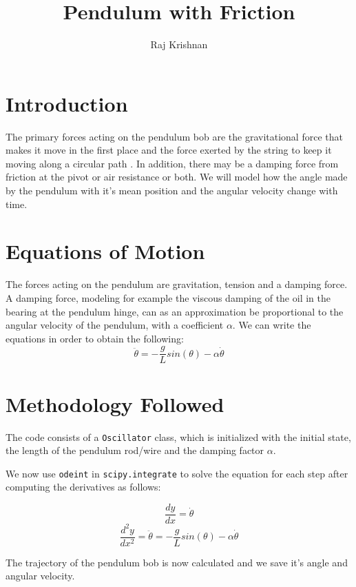 \documentclass[12pt,english]{article}
\title{Pendulum with Friction}
\author{Raj Krishnan}
\begin{document}
\maketitle

\section{Introduction}
  The primary forces acting on the pendulum bob are the gravitational force 
  that makes it move in the first place and the force exerted by the string
  to keep it moving along a circular path \cite{surrow}. In addition, there may be a 
  damping force from friction at the pivot or air resistance or both. We 
  will model how the angle made by the pendulum with it's mean position and
  the angular velocity change with time.

\section{Equations of Motion}
  
  The forces acting on the pendulum are gravitation, tension and a damping
  force. A damping force, modeling for example the viscous damping of the 
  oil in the bearing at the pendulum hinge, can as an approximation be 
  proportional to the angular velocity of the pendulum, with a coefficient 
  $\alpha$. We can write the equations \cite{james} in order to obtain the 
  following:
  \begin{equation}
          \label{eq:eom}
          \ddot{\theta} = -\frac{g}{L}sin(\theta) - \alpha \dot{\theta}                    
  \end{equation}

\section{Methodology Followed}

  The code consists of a \texttt{Oscillator} class, which is initialized with 
  the initial state, the length of the pendulum rod/wire and the damping factor
  $\alpha$. 

  We now use \texttt{odeint} in \texttt{scipy.integrate} to solve the equation 
  for each step after computing the derivatives as follows:
   
  $$\frac{dy}{dx} = \dot{\theta}$$
  $$\frac{d^2y}{dx^2} = \ddot{\theta} 
                      = -\frac{g}{L}sin(\theta) - \alpha \dot{\theta}$$

  The trajectory of the pendulum bob is now calculated and we save it's angle
  and angular velocity.
\end{document}
